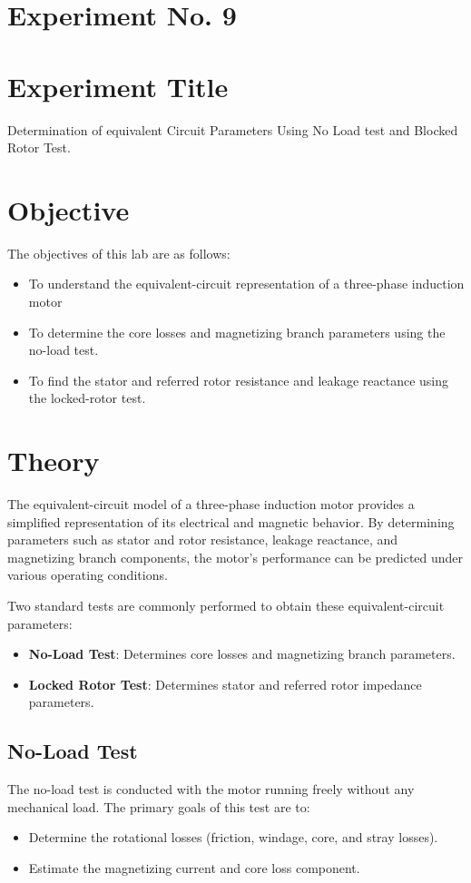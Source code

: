 \documentclass[a4paper,12pt]{article}
\begin{document}
	\section{Experiment No. 9}
	
	\section{Experiment Title }
Determination of equivalent Circuit Parameters Using No Load test and Blocked Rotor Test.

	
	\section{Objective}
	
	The objectives of this lab are as follows:
	\begin{itemize}
		\item 	To understand the equivalent-circuit representation of a three-phase induction motor
		\item 	To determine the core losses and magnetizing branch parameters using the no-load test.
		
		\item  To find the stator and referred rotor resistance and leakage reactance using the locked-rotor
		test.
		
		
	\end{itemize}
\section{Theory}

The equivalent-circuit model of a three-phase induction motor provides a simplified representation of its electrical and magnetic behavior. By determining parameters such as stator and rotor resistance, leakage reactance, and magnetizing branch components, the motor's performance can be predicted under various operating conditions.

Two standard tests are commonly performed to obtain these equivalent-circuit parameters:
\begin{itemize}
	\item \textbf{No-Load Test}: Determines core losses and magnetizing branch parameters.
	\item \textbf{Locked Rotor Test}: Determines stator and referred rotor impedance parameters.
\end{itemize}

\subsection{No-Load Test}
The no-load test is conducted with the motor running freely without any mechanical load. The primary goals of this test are to:
\begin{itemize}
	\item Determine the rotational losses (friction, windage, core, and stray losses).
	\item Estimate the magnetizing current and core loss component.
\end{itemize}
\end{document}
